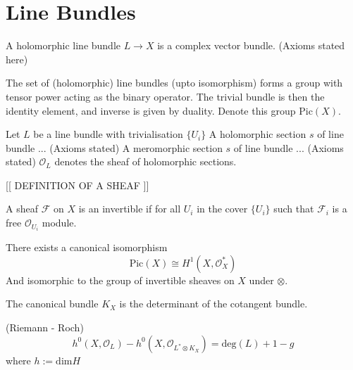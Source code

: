 
\section{Line Bundles} %

\begin{definition}
A holomorphic line bundle $ L \rightarrow  X$ is a complex vector bundle. 
    (Axioms stated here)
\end{definition}

The set of (holomorphic) line bundles (upto isomorphism) forms a group with tensor power acting as the binary operator.
The trivial bundle is then the identity element, and inverse is given by duality.
Denote this group $ \mathrm{Pic}(X) $. 

\begin{definition}
    Let $L$ be a line bundle with trivialisation $\{ U_i \} $ 
    A holomorphic section $s$ of line bundle ... (Axioms stated)
    A meromorphic section $s$ of line bundle ... (Axioms stated)
    $\mathcal{O}_L $ denotes the sheaf of holomorphic sections. 
\end{definition}
 
[[ DEFINITION OF A SHEAF ]] 

\begin{definition}
    A sheaf $ \mathcal{F} $ on $ X$ is an invertible if for all $U_i$  in the cover $\{U_i\} $ 
    such that $ \mathcal{F}_i$ is a free $\mathcal{O}_{U_i} $ module. 
\end{definition}

\begin{theorem}
    There exists a canonical isomorphism 
    \begin{equation}
        \mathrm{Pic} (X)  \cong H^1 ( X, \mathcal{O}^* _ X ) 
    \end{equation}
    And isomorphic to the group of invertible sheaves on $X$ under $ \otimes$. 
\end{theorem}

\begin{definition}
    The canonical bundle $ K_X $ is the determinant of the cotangent bundle. 
\end{definition}

\begin{theorem}
    (Riemann - Roch) 
    \begin{equation}
        h^0 (X, \mathcal{O} _L) - h^0 (X, \mathcal{O}_{L^* \otimes K_X}) = \mathrm{deg} (L) + 1 - g 
    \end{equation}
    where $h := \mathrm{dim} H $ 
\end{theorem}

